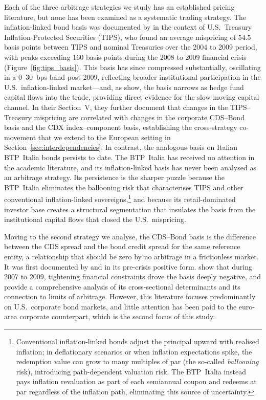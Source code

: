 Each of the three arbitrage strategies we study has an established
pricing literature, but none has been examined as a systematic trading strategy. The
inflation-linked bond basis was documented by
\citet{fleckenstein2014tips} in the context of U.S.\ Treasury
Inflation-Protected Securities (TIPS), who found an average mispricing
of $54.5$ basis points between TIPS and nominal Treasuries over the
2004 to 2009 period, with peaks exceeding $160$ basis points during
the 2008 to 2009 financial crisis
(Figure~\ref{fig:tips_basis}). This basis has since compressed
substantially, oscillating in a 0--30~bps band post-2009, reflecting
broader institutional participation in the U.S.\ inflation-linked
market---and, as \citet{fleckenstein2014tips} show, the basis narrows
as hedge fund capital flows into the trade, providing direct evidence
for the slow-moving capital channel. In their Section~V, they
further document that changes in the TIPS--Treasury mispricing are
correlated with changes in the corporate CDS--Bond basis and the CDX
index--component basis, establishing the cross-strategy co-movement
that we extend to the European setting in
Section~\ref{sec:interdependencies}. In contrast, the analogous basis
on Italian BTP~Italia bonds persists to date. The BTP~Italia has
received no attention in the academic literature, and its
inflation-linked basis has never been analysed as an arbitrage
strategy. Its persistence is
the sharper puzzle because the BTP~Italia eliminates the ballooning
risk that characterises TIPS and other conventional inflation-linked
sovereigns,\footnote{Conventional inflation-linked bonds adjust the
principal upward with realised inflation; in deflationary scenarios
or when inflation expectations spike, the redemption value can grow
to many multiples of par (the so-called \emph{ballooning} risk),
introducing path-dependent valuation risk. The BTP~Italia instead
pays inflation revaluation as part of each semiannual coupon and
redeems at par regardless of the inflation path, eliminating this
source of uncertainty.} and because its retail-dominated investor base
creates a structural segmentation that insulates the basis from the
institutional capital flows that closed the U.S.\ mispricing.

Moving to the second strategy we analyse, the CDS--Bond basis is the
difference between the CDS spread and the bond credit spread for the
same reference entity, a relationship that should be zero by no
arbitrage in a frictionless market. It was first documented by
\citet{hull2004relationship} and \citet{longstaff2005corporate} in
its pre-crisis positive form. \citet{mitchell2012arbitrage} show that
during 2007 to 2009, tightening financial constraints drove the basis
deeply negative, and \citet{bai2019cds} provide a comprehensive
analysis of its cross-sectional determinants and its connection to
limits of arbitrage. However, this literature focuses predominantly
on U.S.\ corporate bond markets, and little attention has been paid
to the euro-area corporate counterpart, which is the second focus of
this study.

